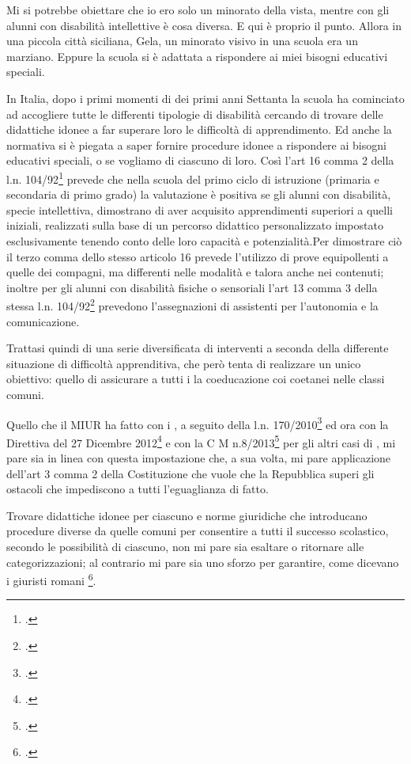 Mi si potrebbe obiettare che io ero solo un minorato della vista, mentre con gli alunni con disabilità intellettive è cosa diversa. E qui è proprio il punto. Allora in una piccola città siciliana, Gela, un minorato visivo in una scuola era un marziano. Eppure la scuola si è adattata a rispondere ai miei bisogni educativi speciali.

In Italia, dopo i primi momenti di  dei primi anni Settanta la scuola ha cominciato ad accogliere tutte le differenti tipologie di disabilità cercando di trovare delle didattiche idonee a far superare loro le difficoltà di apprendimento. Ed anche la normativa si è piegata a saper fornire procedure idonee a rispondere ai bisogni educativi speciali, o se vogliamo   di ciascuno di loro. Così l'art 16 comma 2 della l.n. 104/92\footcite{Legge_104_92} prevede che nella scuola del primo ciclo di istruzione (primaria e secondaria di primo grado) la valutazione è positiva se gli alunni con disabilità, specie intellettiva, dimostrano di aver acquisito apprendimenti superiori a quelli iniziali, realizzati sulla base di un percorso didattico personalizzato impostato esclusivamente tenendo conto delle loro capacità e potenzialità.Per dimostrare ciò il terzo comma dello stesso articolo 16 prevede l'utilizzo di prove equipollenti a quelle dei compagni, ma differenti nelle modalità e talora anche nei contenuti; inoltre per gli alunni con disabilità fisiche o sensoriali l'art 13 comma 3 della stessa l.n. 104/92\footcite{Legge_104_92} prevedono l'assegnazioni di assistenti per l'autonomia e la comunicazione.

Trattasi quindi di una serie diversificata di interventi a seconda della differente situazione di difficoltà apprenditiva, che però tenta di realizzare un unico obiettivo: quello di assicurare a tutti i   la coeducazione coi coetanei nelle classi comuni.

Quello che il MIUR ha fatto con i , a seguito della l.n. 170/2010\footcite{legge170} ed ora con la Direttiva del 27 Dicembre 2012\footcite{dir27Dic2012} e con la C M n.8/2013\footcite{cm8_2013} per gli altri casi di , mi pare sia in linea con questa impostazione che, a sua volta, mi pare applicazione dell'art 3 comma 2 della Costituzione che vuole che la Repubblica superi gli ostacoli che impediscono a tutti l'eguaglianza di fatto.

Trovare didattiche idonee per ciascuno e norme giuridiche che introducano procedure diverse da quelle comuni per consentire a tutti il successo scolastico, secondo le possibilità di ciascuno, non mi pare sia esaltare o ritornare alle categorizzazioni; al contrario mi pare sia uno sforzo per garantire, come dicevano i giuristi romani \footcite{Nocera2013}.